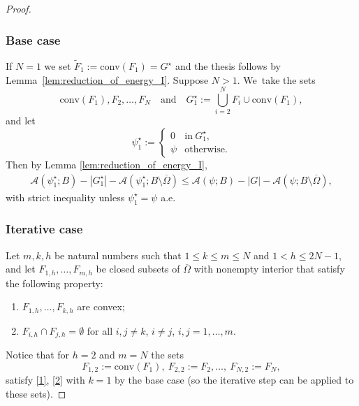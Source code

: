 \documentclass[JEP,XML,SOM,Unicode, NoFloatCountersInSection,published]{cedram}
\let\Om\Omega
\theoremstyle{definition}
\begin{document}
\skpt
\begin{proof}\vspace*{-\baselineskip}

\subsubsection*{Base case}
If $N=1$ we set $\widetilde F_1:= \mathrm{conv}(F_1)=G^\star$ and the thesis follows by Lemma~\ref{lem:reduction_of_energy_I}. Suppose $N >1$. We~take the sets
\begin{equation}\label{sets_base_case}
\mathrm{conv}(F_1), F_2, \dots, F_N\quad\text{and}\quad G_1^\star:=\bigcup_{i=2}^NF_{i}\cup\mathrm{conv}(F_1),
\end{equation}
and let
\begin{equation*}
\psi_1^\star:=\begin{cases}
0&\text{in}\ G_1^\star,\\
\psi&\text{otherwise}.
\end{cases}
\end{equation*}
Then by Lemma \ref{lem:reduction_of_energy_I},
\begin{align}\label{base_case}
\mathcal A(\psi_1^\star;B)-|G_1^\star|-\mathcal A(\psi_1^\star;B\setminus \overline\Omega)\leq
\mathcal A(\psi;B)-|G|-\mathcal A(\psi;B\setminus \overline\Omega),
\end{align}
with strict inequality unless $\psi_1^\star=\psi$ a.e.

\subsubsection*{Iterative case}
Let $m,k,h$ be natural numbers such that $1\le k\le m\le N$ and $1<h\le 2N-1$, and let $F_{1,h},\dots,F_{m,h}$ be closed subsets of $\overline \Om$
with nonempty interior that satisfy the following property:
\begin{enumerate}[label=($\arabic*$),wide]
\item \label{1}$F_{1,h},\dots,F_{k,h}$ are convex;
\item\label{2} $F_{i,h}\cap F_{j,h}=\emptyset$ for all $i, j\ne k$, $i\ne j$, $i,j=1,\dots,m$.
\end{enumerate}
Notice that for $h=2$ and $m=N$ the sets
\begin{equation*}
F_{1,2}:=\mathrm{conv}(F_1),\ F_{2,2}:=F_2,\dots,\ F_{N,2}:=F_N,
\end{equation*}
satisfy \ref{1}, \ref{2} with $k=1$ by the base case (so the iterative step can be applied to these sets).


\end{proof}
\end{document}
